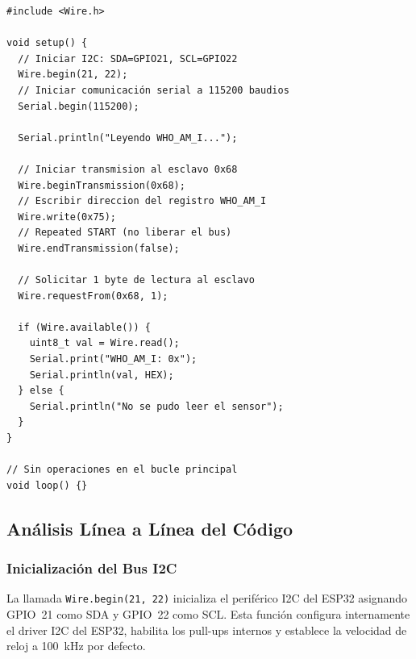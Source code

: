 \documentclass[10pt,twocolumn,a4paper]{article}
\begin{document}
\begin{lstlisting}[style=arduino,
  caption={herramienta\_who\_i\_am\_id\_interno\_arduino\_ide.ino},
  label=lst:code]
#include <Wire.h>

void setup() {
  // Iniciar I2C: SDA=GPIO21, SCL=GPIO22
  Wire.begin(21, 22);
  // Iniciar comunicación serial a 115200 baudios
  Serial.begin(115200);

  Serial.println("Leyendo WHO_AM_I...");

  // Iniciar transmision al esclavo 0x68
  Wire.beginTransmission(0x68);
  // Escribir direccion del registro WHO_AM_I
  Wire.write(0x75);
  // Repeated START (no liberar el bus)
  Wire.endTransmission(false);

  // Solicitar 1 byte de lectura al esclavo
  Wire.requestFrom(0x68, 1);

  if (Wire.available()) {
    uint8_t val = Wire.read();
    Serial.print("WHO_AM_I: 0x");
    Serial.println(val, HEX);
  } else {
    Serial.println("No se pudo leer el sensor");
  }
}

// Sin operaciones en el bucle principal
void loop() {}
\end{lstlisting}


\medskip
{}

\subsection{Análisis Línea a Línea del Código}

\subsubsection{Inicialización del Bus I2C}
La llamada \texttt{Wire.begin(21, 22)} inicializa el periférico I2C
del ESP32 asignando GPIO~21 como SDA y GPIO~22 como SCL. Esta función
configura internamente el driver I2C del ESP32, habilita los pull-ups
internos y establece la velocidad de reloj a 100~kHz por defecto.
\end{document}
